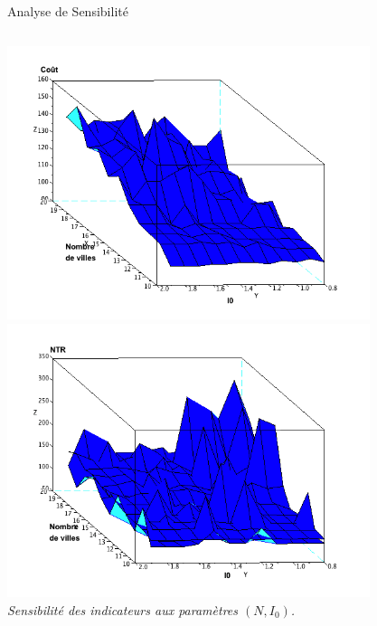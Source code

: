 \documentclass{beamer}
\begin{document}
\begin{frame}{}
\begin{columns}[t]
\begin{column}{.49\textwidth}
\begin{block}{Analyse de Sensibilité}
\begin{columns}[t]
\begin{column}{.47\textwidth}
          \includegraphics[width=0.5\columnwidth,height=8cm]{figures/graphe_cout}
          \includegraphics[width=0.5\columnwidth,height=8cm]{figures/graphe_NTR}\\
          \bigskip
          \textit{Sensibilité des indicateurs aux paramètres $(N,I_0)$.}
          

          \end{column}
          \begin{column}{.47\textwidth}
          

\end{column}
\end{columns}
\end{block}
\end{column}
\end{columns}
\end{frame}
\end{document}
